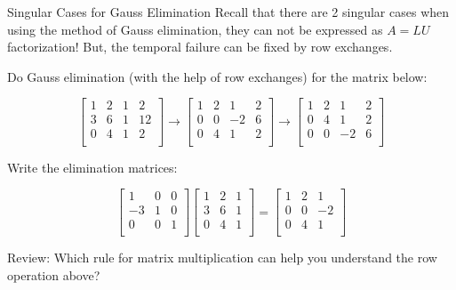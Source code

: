\documentclass{beamer}
\begin{document}
\begin{frame}{Singular Cases for Gauss Elimination}
Recall that there are 2 singular cases when using the method of Gauss elimination, they can not be expressed as $A=LU$ factorization! But, the temporal failure can be fixed by row exchanges.

\vspace{3pt}
Do Gauss elimination (with the help of row exchanges) for the matrix below:

\begin{equation*}
    \left[ \begin{matrix}
        1&		2&		1&		2\\
        3&		6&		1&		12\\
        0&		4&		1&		2\\
    \end{matrix} \right] \rightarrow \left[ \begin{matrix}
        1&		2&		1&		2\\
        0&		0&		-2&		6\\
        0&		4&		1&		2\\
    \end{matrix} \right] \rightarrow \left[ \begin{matrix}
        1&		2&		1&		2\\
        0&		4&		1&		2\\
        0&		0&		-2&		6\\
    \end{matrix} \right]
\end{equation*}

Write the elimination matrices:

\begin{equation*}
    \left[ \begin{matrix}
        1&		0&		0\\
        -3&		1&		0\\
        0&		0&		1\\
    \end{matrix} \right] \left[ \begin{matrix}
        1&		2&		1\\
        3&		6&		1\\
        0&		4&		1\\
    \end{matrix} \right] =\left[ \begin{matrix}
        1&		2&		1\\
        0&		0&		-2\\
        0&		4&		1\\
    \end{matrix} \right]
\end{equation*}

Review: Which rule for matrix multiplication can help you understand the row operation above?

\end{frame}
\end{document}
